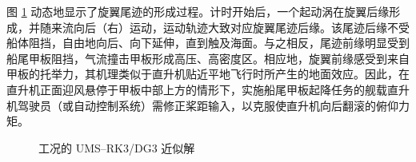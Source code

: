 图 \ref{fig:ship_a=00003D0_p=00003D3} 动态地显示了旋翼尾迹的形成过程。计时开始后，一个起动涡在旋翼后缘形成，并随来流向后（右）运动，运动轨迹大致对应旋翼尾迹后缘。该尾迹后缘不受船体阻挡，自由地向后、向下延伸，直到触及海面。与之相反，尾迹前缘明显受到船尾甲板阻挡，气流撞击甲板形成高压、高密度区。相应地，旋翼前缘感受到来自甲板的托举力，其机理类似于直升机贴近平地飞行时所产生的地面效应。因此，在直升机正面迎风悬停于甲板中部上方的情形下，实施船尾甲板起降任务的舰载直升机驾驶员（或自动控制系统）需修正桨距输入，以克服使直升机向后翻滚的俯仰力矩。

\begin{figure}[h!]
\begin{centering}
\par\end{centering}
\begin{centering}
\par\end{centering}
\caption{\label{fig:ship_a=00003D0_p=00003D3}工况的
UMS–RK3/DG3 近似解}
\end{figure}

